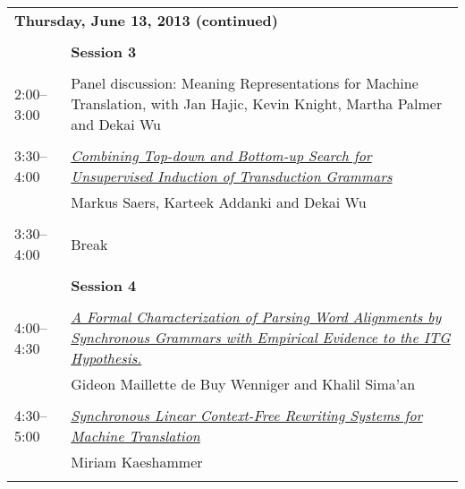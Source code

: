 \newpage
\begin{tabular}{p{20mm}p{138mm}}
\\
\multicolumn{2}{l}{\bf Thursday, June 13, 2013 (continued)} \\\\
 & {\bf Session 3} \\
\\
2:00--3:00 & Panel discussion: Meaning Representations for Machine Translation, with Jan Hajic, Kevin Knight, Martha Palmer and Dekai Wu \\
\\
3:30--4:00 & \hyperlink{page.48}{\em Combining Top-down and Bottom-up Search for Unsupervised Induction of Transduction Grammars}\\
         & Markus Saers, Karteek Addanki and Dekai Wu \\
\\

3:30--4:00 & Break \\
\\
 & {\bf Session 4} \\
\\
4:00--4:30 & \hyperlink{page.58}{\em A Formal Characterization of Parsing Word Alignments by Synchronous Grammars with Empirical Evidence to the ITG Hypothesis.}\\
         & Gideon Maillette de Buy Wenniger and Khalil Sima'an \\
\\

4:30--5:00 & \hyperlink{page.68}{\em Synchronous Linear Context-Free Rewriting Systems for Machine Translation}\\
         & Miriam Kaeshammer \\
\\



\end{tabular}
